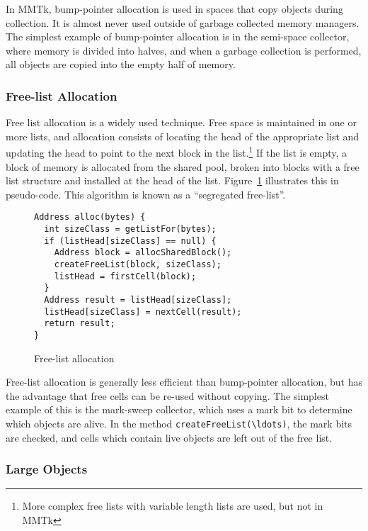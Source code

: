 In MMTk, bump-pointer allocation is used in spaces that copy objects during collection.  
It is almost never used outside of garbage collected memory managers.  The simplest example
of bump-pointer allocation is in the semi-space collector, where memory is divided into halves,
and when a garbage collection is performed, all objects are copied into the empty half of memory.

\subsubsection{Free-list Allocation}

Free list allocation is a widely used technique.  Free space is maintained in one or more lists,
and allocation consists of locating the head of the appropriate list and updating the head to point
to the next block in the list.\footnote{More complex free lists with variable length lists are used, but not in MMTk}
If the list is empty, a block of memory is allocated from the shared pool, broken into blocks
with a free list structure and installed at the head of the list.  Figure~\ref{fig:intro:free-list}
illustrates this in pseudo-code.  This algorithm is known as a ``segregated free-list''.

\begin{figure}[h!]
\begin{lstlisting}
Address alloc(bytes) {
  int sizeClass = getListFor(bytes);
  if (listHead[sizeClass] == null) {
    Address block = allocSharedBlock();
    createFreeList(block, sizeClass);
    listHead = firstCell(block);
  }
  Address result = listHead[sizeClass];
  listHead[sizeClass] = nextCell(result);
  return result;
}
\end{lstlisting}
\caption{Free-list allocation}
\label{fig:intro:free-list}
\end{figure}

Free-list allocation is generally less efficient than bump-pointer allocation, but has the advantage
that free cells can be re-used without copying.  The simplest example of this is the mark-sweep 
collector, which uses a mark bit to determine which objects are alive.  In the method 
\lstinline|createFreeList(\ldots)|, the mark bits are checked, and cells which contain live
objects are left out of the free list.

\subsubsection{Large Objects}

